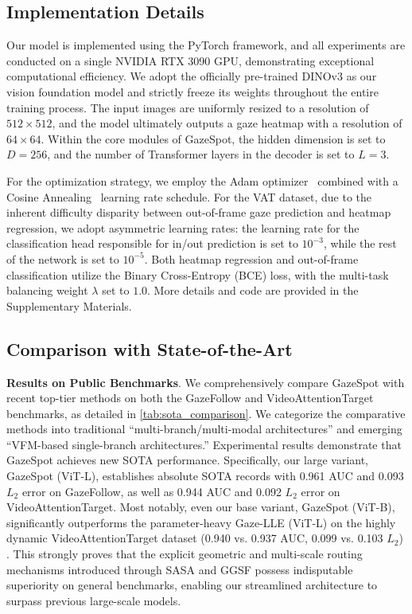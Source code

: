 \documentclass[sigconf,review,anonymous,screen]{acmart}
\begin{document}
\subsection{Implementation Details}
Our model is implemented using the PyTorch framework, and all experiments are conducted on a single NVIDIA RTX 3090 GPU, demonstrating exceptional computational efficiency. We adopt the officially pre-trained DINOv3 as our vision foundation model and strictly freeze its weights throughout the entire training process. The input images are uniformly resized to a resolution of $512 \times 512$, and the model ultimately outputs a gaze heatmap with a resolution of $64 \times 64$. Within the core modules of GazeSpot, the hidden dimension is set to $D = 256$, and the number of Transformer layers in the decoder is set to $L = 3$. 

For the optimization strategy, we employ the Adam optimizer~\cite{diederik2014adam} combined with a Cosine Annealing~\cite{loshchilov2016sgdr} learning rate schedule. For the VAT dataset, due to the inherent difficulty disparity between out-of-frame gaze prediction and heatmap regression, we adopt asymmetric learning rates: the learning rate for the classification head responsible for in/out prediction is set to $10^{-3}$, while the rest of the network is set to $10^{-5}$. Both heatmap regression and out-of-frame classification utilize the Binary Cross-Entropy (BCE) loss, with the multi-task balancing weight $\lambda$ set to $1.0$. More details and code are provided in the Supplementary Materials.

\subsection{Comparison with State-of-the-Art}

\textbf{Results on Public Benchmarks}.
We comprehensively compare GazeSpot with recent top-tier methods on both the GazeFollow and VideoAttentionTarget benchmarks, as detailed in \autoref{tab:sota_comparison}. We categorize the comparative methods into traditional ``multi-branch/multi-modal architectures'' and emerging ``VFM-based single-branch architectures.'' Experimental results demonstrate that GazeSpot achieves new SOTA performance. Specifically, our large variant, GazeSpot (ViT-L), establishes absolute SOTA records with 0.961 AUC and 0.093 $L_2$ error on GazeFollow, as well as 0.944 AUC and 0.092 $L_2$ error on VideoAttentionTarget. Most notably, even our base variant, GazeSpot (ViT-B), significantly outperforms the parameter-heavy Gaze-LLE (ViT-L) on the highly dynamic VideoAttentionTarget dataset (0.940 vs. 0.937 AUC, 0.099 vs. 0.103 $L_2$) . This strongly proves that the explicit geometric and multi-scale routing mechanisms introduced through SASA and GGSF possess indisputable superiority on general benchmarks, enabling our streamlined architecture to surpass previous large-scale models.
\end{document}
